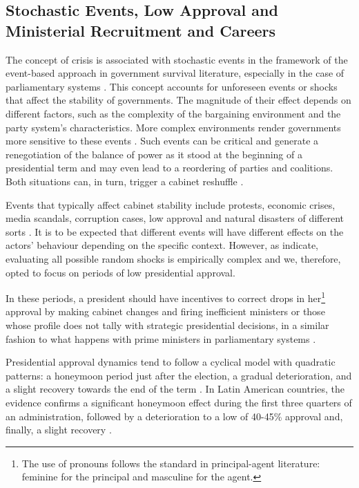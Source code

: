 \documentclass[12pt,halfline,a4paper]{ouparticle}
\begin{document}
\subsection{Stochastic Events, Low Approval and Ministerial Recruitment and Careers}
\label{sec2.1}

The concept of crisis is associated with stochastic events in the framework of the event-based approach in government survival literature, especially in the case of parliamentary systems \citep{Browne1986, Fortunato2018, King1990, Warwick1994}. This concept accounts for unforeseen events or shocks that affect the stability of governments. The magnitude of their effect depends on different factors, such as the complexity of the bargaining environment and the party system’s characteristics. More complex environments render governments more sensitive to these events \citep{Chiba2015, Laver1996, Laver1990}. Such events can be critical and generate a renegotiation of the balance of power as it stood at the beginning of a presidential term and may even lead to a reordering of parties and coalitions. Both situations can, in turn, trigger a cabinet reshuffle \citep{MartinezGallardo2012}.

Events that typically affect cabinet stability include protests, economic crises, media scandals, corruption cases, low approval and natural disasters of different sorts \citep{Camerlo2015a, MartinezGallardo2014}. It is to be expected that different events will have different effects on the actors’ behaviour depending on the specific context. However, as \cite{Berlinski2010} indicate, evaluating all possible random shocks is empirically complex and we, therefore, opted to focus on periods of low presidential approval.

In these periods, a president should have incentives to correct drops in her\footnote{The use of pronouns follows the standard in principal-agent literature: feminine for the principal and masculine for the agent.} approval by making cabinet changes and firing inefficient ministers or those whose profile does not tally with strategic presidential decisions, in a similar fashion to what happens with prime ministers in parliamentary systems \citep{Dewan2005, McAllister2003}. 

Presidential approval dynamics tend to follow a cyclical model with quadratic patterns: a honeymoon period just after the election, a gradual deterioration, and a slight recovery towards the end of the term \citep[][see also \citeauthor{Brace1992}, \citeyear{Brace1992}; \citeauthor{Carlin2018}, \citeyear{Carlin2018}]{Stimson1976}. In Latin American countries, the evidence confirms a significant honeymoon effect during the first three quarters of an administration, followed by a deterioration to a low of 40-45\% approval and, finally, a slight recovery \citep{Carlin2019b, Carlin2018}.
\end{document}
